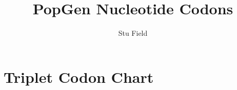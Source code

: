 \documentclass[12pt,a4paper]{article}
\title{PopGen Nucleotide Codons}
\author{Stu Field}
\date{}   %
\begin{document}
\maketitle

\def \thesection{\Roman{section}}  %



\def \xl{\multicolumn{1}{|c|}{}}
\section{Triplet Codon Chart}
\renewcommand{\arraystretch}{2}
\end{document}
